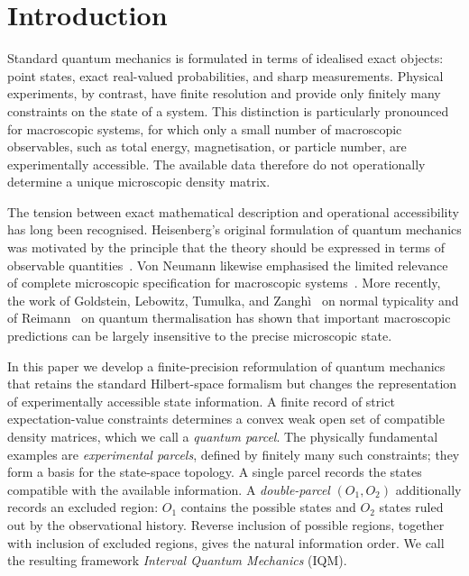 \documentclass[11pt, onecolumn]{article}
\begin{document}
\maketitle

\section{Introduction}

Standard quantum mechanics is formulated in terms of idealised exact objects:
point states, exact real-valued probabilities, and sharp measurements. Physical
experiments, by contrast, have finite resolution and provide only finitely many
constraints on the state of a system. This distinction is particularly
pronounced for macroscopic systems, for which only a small number of
macroscopic observables, such as total energy, magnetisation, or particle
number, are experimentally accessible. The available data therefore do not
operationally determine a unique microscopic density matrix.

The tension between exact mathematical description and operational
accessibility has long been recognised. Heisenberg's original formulation of
quantum mechanics was motivated by the principle that the theory should be
expressed in terms of observable quantities~\cite{Heisenberg1925}. Von Neumann
likewise emphasised the limited relevance of complete microscopic
specification for macroscopic systems~\cite{vonNeumann1955}. More recently,
the work of Goldstein, Lebowitz, Tumulka, and Zanghì~\cite{GLTZ2010} on normal
typicality and of Reimann~\cite{Reimann2015} on quantum thermalisation has
shown that important macroscopic predictions can be largely insensitive to
the precise microscopic state.

In this paper we develop a finite-precision reformulation of quantum
mechanics that retains the standard Hilbert-space formalism but changes the
representation of experimentally accessible state information. A finite
record of strict expectation-value constraints determines a convex weak open
set of compatible density matrices, which we call a \emph{quantum parcel}.
The physically fundamental examples are \emph{experimental parcels}, defined
by finitely many such constraints; they form a basis for the state-space
topology. A single parcel records the states compatible with the available
information. A \emph{double-parcel} $(O_1,O_2)$ additionally records an
excluded region: $O_1$ contains the possible states and $O_2$ states ruled
out by the observational history. Reverse inclusion of possible regions,
together with inclusion of excluded regions, gives the natural information
order. We call the resulting framework \emph{Interval Quantum Mechanics}
(IQM).
\end{document}
